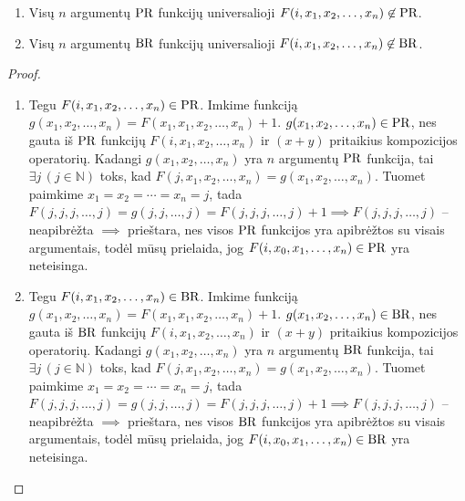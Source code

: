 \begin{prop}
  \hfill
  \begin{enumerate}
    \item Visų $n$ argumentų $\mathop{\text{PR}}$ funkcijų universalioji
      $F(i,x_1,x_2,\dotsc,x_n) \not \in \mathop{\text{PR}}$.
    \item Visų $n$ argumentų $\mathop{\text{BR}}$ funkcijų universalioji
      $F(i,x_1,x_2,\dotsc,x_n) \not \in \mathop{\text{BR}}$.
  \end{enumerate}
  \begin{proof}
    \begin{enumerate}
      \item Tegu $F(i,x_1,x_2,\dotsc,x_n) \in \mathop{\text{PR}}$.
        Imkime funkciją 
        $g(x_1,x_2,\dotsc,x_n) = F(x_1,x_1,x_2,\dotsc,x_n)+1$.
        $g(x_1,x_2,\dotsc,x_n) \in \mathop{\text{PR}}$, nes gauta iš $\mathop{\text{PR}}$ funkcijų
        $F(i,x_1,x_2,\dotsc,x_n)$ ir $(x+y)$ pritaikius kompozicijos
        operatorių. Kadangi $g(x_1,x_2,\dotsc,x_n)$ yra $n$ argumentų
        $\mathop{\text{PR}}$ funkcija, tai $\exists j\, (j \in \mathbb{N})$ toks, kad
        $F(j,x_1,x_2,\dotsc,x_n) = g(x_1,x_2,\dotsc,x_n)$. Tuomet
        paimkime $x_1 = x_2 = \cdots = x_n = j$, tada 
        $F(j, j, j, \dotsc, j) = g(j, j, \dotsc, j) =%
        F(j, j, j, \dotsc, j) + 1 \implies F(j, j, j, \dotsc, j)$ – 
        neapibrėžta $\implies$ prieštara, nes visos $\mathop{\text{PR}}$ funkcijos
        yra apibrėžtos su visais argumentais, todėl mūsų prielaida, jog
        $F(i,x_0,x_1,\dotsc,x_n) \in \mathop{\text{PR}}$ yra neteisinga.

      \item Tegu $F(i,x_1,x_2,\dotsc,x_n) \in \mathop{\text{BR}}$.
        Imkime funkciją 
        $g(x_1,x_2,\dotsc,x_n) = F(x_1,x_1,x_2,\dotsc,x_n)+1$.
        $g(x_1,x_2,\dotsc,x_n) \in \mathop{\text{BR}}$, nes gauta iš $\mathop{\text{BR}}$ funkcijų
        $F(i,x_1,x_2,\dotsc,x_n)$ ir $(x+y)$ pritaikius kompozicijos
        operatorių. Kadangi $g(x_1,x_2,\dotsc,x_n)$ yra $n$ argumentų
        $\mathop{\text{BR}}$ funkcija, tai $\exists j\, (j \in \mathbb{N})$ toks, kad
        $F(j,x_1,x_2,\dotsc,x_n) = g(x_1,x_2,\dotsc,x_n)$. Tuomet
        paimkime $x_1 = x_2 = \cdots = x_n = j$, tada 
        $F(j, j, j, \dotsc, j) = g(j, j, \dotsc, j) =%
        F(j, j, j, \dotsc, j) + 1 \implies F(j, j, j, \dotsc, j)$ – 
        neapibrėžta $\implies$ prieštara, nes visos $\mathop{\text{BR}}$ funkcijos
        yra apibrėžtos su visais argumentais, todėl mūsų prielaida, jog
        $F(i,x_0,x_1,\dotsc,x_n) \in \mathop{\text{BR}}$ yra neteisinga.
    \end{enumerate}
  \end{proof}
\end{prop}

